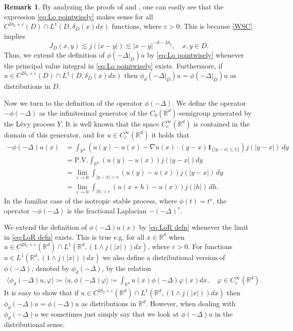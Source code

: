 \documentclass[12pt,a4paper,onecolumn]{amsart}
\theoremstyle{definition}
\newtheorem{rem}[thm]{Remark}
\newcommand{\R}{\mathbb{R}}
\newcommand{\1}{\mathbf 1}
\newcommand{\LLL}{L^1(D,\de(x)dx)}
\newcommand{\Lo}{\phi(-\left.\Delta\right\vert_{D})}
\newcommand{\wLo}{\phi_d(-\left.\Delta\right\vert_{D})}
\newcommand{\LoR}{\phi(-\Delta)}
\newcommand{\wLoR}{\phi_d(-\Delta)}
\newcommand{\de}{\delta_D}
\numberwithin{equation}{section}
\begin{document}
\begin{rem}\label{r:pointwise solution}
    By analyzing the proofs of \cite[Lemma 2.4]{Bio23} and \cite[Remark 2.6]{Bio23}, one can easily see that the expression \eqref{eq:Lo pointwisely} makes sense for all $C^{2\delta_2+\varepsilon}(D)\cap \LLL$ functions, where $\varepsilon>0$. This is because \ref{WSC} implies
    \[
    J_D(x,y)\lesssim j(|x-y|)\lesssim |x-y|^{-d-2\delta_2},\quad x,y\in D.
    \]
    Thus, we extend the definition of $\Lo u$ by \eqref{eq:Lo pointwisely} whenever the principal value integral in \eqref{eq:Lo pointwisely} exists.
   Furthermore, if $u\in C^{2\delta_2+\varepsilon}(D)\cap \LLL$ then $\wLo u=\Lo u$ as distributions in $D$.
\end{rem}


Now we turn to the definition of the operator $\LoR$. We define the operator $-\LoR$ as the infinitesimal generator of the $C_0(\R^d)$-semigroup generated by the L\'evy process $Y$. It is well known that the space $C_c^{\infty}(\R^d)$ is contained in the domain of this generator, and for $u\in C_c^{\infty}(\R^d)$ it holds that
\begin{align}
-\LoR u(x)&=\int_{\R^d}\left(u(y)-u(x)-  \nabla u(x) \cdot (y-x)\1_{\{|y-x|\le 1\}}\right)j(|y-x|)\, dy \nonumber\\
&=\textrm{P.V.}\int_{\R^d} \left(u(y)-u(x)\right)j(|y-x|)dy\label{eq:LoR defn}\\
&=\lim_{\epsilon \to 0} \int_{|y-x|>\epsilon} \left(u(y)-u(x)\right)j(|y-x|)\, dy\nonumber\\
&=\lim_{\epsilon \to 0} \int_{|h|>\epsilon} \left(u(x+h)-u(x)\right)j(|h|)\, dh.\nonumber
\end{align}
In the familiar case of the isotropic stable process, where $\phi(t)=t^s$, the operator $-\LoR$ is the fractional Laplacian $-(-\Delta)^s$.

We extend the definition of $\LoR u(x)$ by \eqref{eq:LoR defn} whenever the limit in \eqref{eq:LoR defn} exists. This is true e.g. for all $x\in \R^d$ when $u\in C^{2\delta_2+\varepsilon}(\R^d)\cap L^1(\R^d,(1\wedge j(|x|))dx)$, where $\varepsilon>0$.
For functions $u\in  L^1(\R^d,(1\wedge j(|x|))dx)$ we also define a distributional version of $\LoR$, denoted by $\wLoR$, by the relation
	\begin{align*}
		\langle \wLoR u,\varphi\rangle\coloneqq \langle u,\LoR\varphi\rangle\coloneqq \int_{\R^d}u(x)\LoR\varphi(x)dx,\quad \varphi\in C_c^\infty(\R^d).
	\end{align*}
	It is easy to show that if $u\in C^{2\delta_2+\varepsilon}(\R^d)\cap L^1(\R^d,(1\wedge j(|x|))dx)$ then $\wLoR u=\LoR u$ as distributions in $\R^d$. However, when dealing with $\wLoR u$ we sometimes just simply say that we look at $\LoR u$ in the distributional sense.
\end{document}
